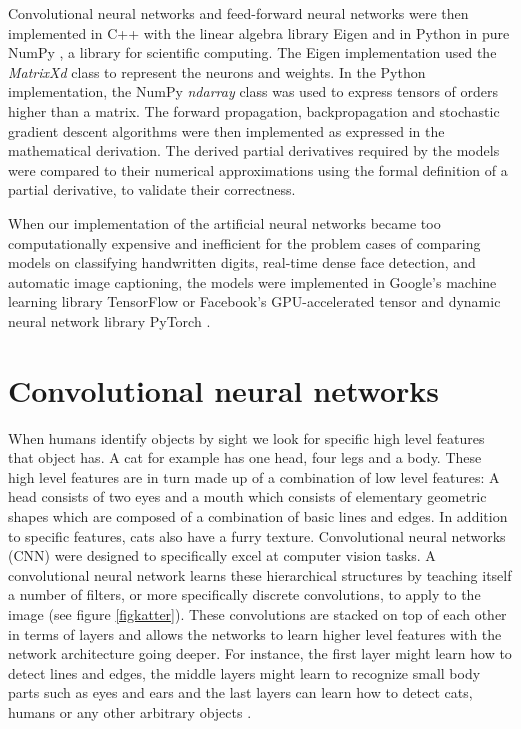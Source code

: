 \documentclass[a4paper, twoside]{article}
\begin{document}
Convolutional neural networks and feed-forward neural networks were then implemented in C++ with the linear algebra library Eigen \cite{eigen} and in Python in pure NumPy \cite{numpy}, a library for scientific computing. The Eigen implementation used the \textit{MatrixXd} class to represent the neurons and weights. In the Python implementation, the NumPy \textit{ndarray} class was used to express tensors of orders higher than a matrix. The forward propagation, backpropagation and stochastic gradient descent algorithms were then implemented as expressed in the mathematical derivation. The derived partial derivatives required by the models were compared to their numerical approximations using the formal definition of a partial derivative, to validate their correctness. 

When our implementation of the artificial neural networks became too computationally expensive and inefficient for the problem cases of comparing models on classifying handwritten digits, real-time dense face detection, and automatic image captioning, the models were implemented in Google's machine learning library TensorFlow \cite{tensorflow} or Facebook's GPU-accelerated tensor and dynamic neural network library PyTorch \cite{pytorch}.

\section{Convolutional neural networks}
When humans identify objects by sight we look for specific high level features that object has. A cat for example has one head, four legs and a body. These high level features are in turn made up of a combination of low level features: A head consists of two eyes and a mouth which consists of elementary geometric shapes which are composed of a combination of basic lines and edges. In addition to specific features, cats also have a furry texture. Convolutional neural networks (CNN) were designed to specifically excel at computer vision tasks. A convolutional neural network learns these hierarchical structures by teaching itself a number of filters, or more specifically discrete convolutions, to apply to the image (see figure \ref{figkatter}). These convolutions are stacked on top of each other in terms of layers and allows the networks to learn higher level features with the network architecture going deeper. For instance, the first layer might learn how to detect lines and edges, the middle layers might learn to recognize small body parts such as eyes and ears and the last layers can learn how to detect cats, humans or any other arbitrary objects \cite{cs231n}.
\end{document}
